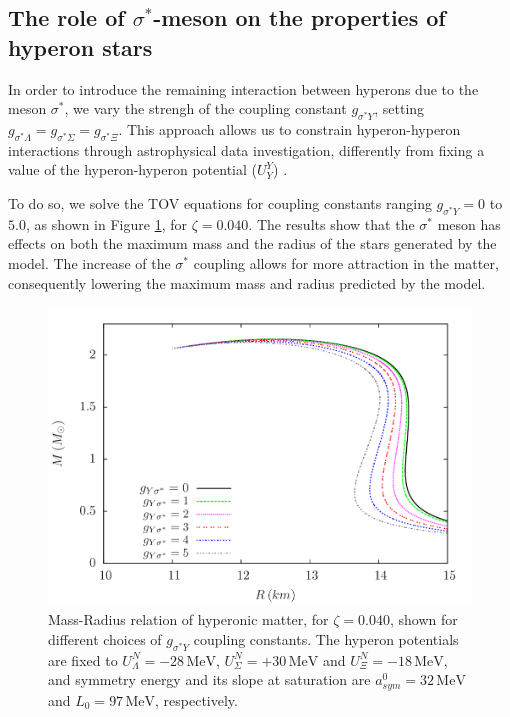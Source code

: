 \documentclass[twocolumn,showpacs,aps]{revtex4}
\begin{document}
\subsection{The role of $\sigma^*$-meson on the properties of hyperon stars}  \label{gss_section}
 
In order to introduce the remaining interaction between hyperons due to the meson $\sigma^*$,
we vary the strengh of the coupling constant $g_{\sigma^* Y}$, setting $g_{\sigma^* \Lambda}=g_{\sigma^* \Sigma}=g_{\sigma^* \Xi}$. 
This approach allows us to constrain hyperon-hyperon interactions through astrophysical data investigation, 
differently from fixing a value of the hyperon-hyperon potential ($U_Y^Y$) \cite{Schaffner:1995th,Mi:2010zz}.

  
To do so, we solve the TOV equations for coupling constants ranging $g_{\sigma^* Y}=0$ to $5.0$, as shown in 
Figure \ref{tov_l0040_gss}, for $\zeta=0.040$.
The results show that the $\sigma^*$ meson has effects on both the maximum mass and the radius of the
stars generated by the model.
The increase of the $\sigma^*$ coupling allows for more attraction in the matter, consequently
lowering the maximum mass and radius predicted by the model. 

 \begin{figure}
 \centering
 \vspace{1.0cm}
 \includegraphics[width=9.cm]{tov_paper_l0040_gss.png}
 \caption{\label{tov_l0040_gss} Mass-Radius relation of hyperonic matter, for $\zeta=0.040$, shown for different choices of $g_{\sigma^* Y}$ coupling constants. 
 The hyperon potentials are fixed to $U_{\Lambda}^N=-28 \,\mathrm{MeV}$, $U_{\Sigma}^N=+30 \,\mathrm{MeV}$ and $U_{\Xi}^N=-18\,\mathrm{MeV} $, and symmetry energy and its slope 
 at saturation are $a_{sym}^0= 32 \,\mathrm{MeV}$ and $L_0=97\,\mathrm{MeV}$, respectively.}
 \end{figure}
\end{document}
